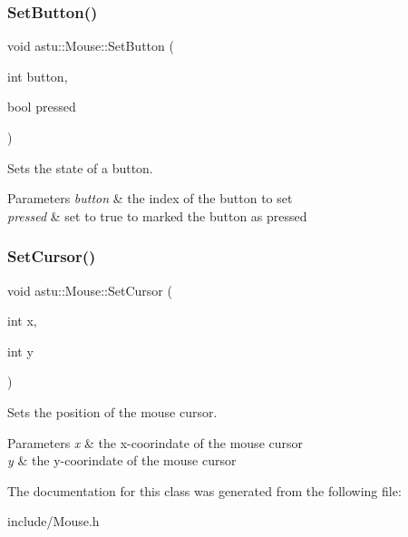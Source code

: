 \subsubsection{\texorpdfstring{Set\+Button()}{SetButton()}}
{\footnotesize\ttfamily void astu\+::\+Mouse\+::\+Set\+Button (\begin{DoxyParamCaption}\item[{int}]{button,  }\item[{bool}]{pressed }\end{DoxyParamCaption})}

Sets the state of a button.


\begin{DoxyParams}{Parameters}
{\em button} & the index of the button to set \\
\hline
{\em pressed} & set to {\ttfamily true} to marked the button as pressed \\
\hline
\end{DoxyParams}
\mbox{\label{classastu_1_1Mouse_a1aebb61a647f115381eeb2d3528fefe8}} 
\subsubsection{\texorpdfstring{Set\+Cursor()}{SetCursor()}}
{\footnotesize\ttfamily void astu\+::\+Mouse\+::\+Set\+Cursor (\begin{DoxyParamCaption}\item[{int}]{x,  }\item[{int}]{y }\end{DoxyParamCaption})}

Sets the position of the mouse cursor.


\begin{DoxyParams}{Parameters}
{\em x} & the x-\/coorindate of the mouse cursor \\
\hline
{\em y} & the y-\/coorindate of the mouse cursor \\
\hline
\end{DoxyParams}


The documentation for this class was generated from the following file\+:\begin{DoxyCompactItemize}
\item 
include/Mouse.\+h\end{DoxyCompactItemize}
